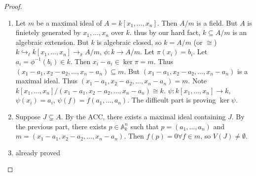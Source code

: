 \documentclass[12pt]{article}
\newcommand{\A}{\mathbb{A}}
\newcommand{\argmax}{\operatornamewithlimits{argmax}}
\begin{document}
   \begin{proof}
   \begin{enumerate}
   \item Let $m$ be a maximal ideal of $A=k[x_1,\dots,x_n]$.  Then $A/m$ is a field.  But $A$ is finietely generated by $x_1,\dots,x_n$ over $k$.  thus by our hard fact, $k\subseteq A/m$ is an algebraic extension.  But $k$ is algebraic closed, so $k=A/m$ (or $\cong$)
   $k\hookrightarrow_\ell k[x_1,\dots,x_n]\to_\pi A/m$, $\phi: k\to A/m$.
   Let $\pi(x_i)=b_i$.  Let $a_i=\phi^{-1}(b_i)\in k$.  Then $x_i-a_i\in \ker \pi = m$.  Thus $(x_1-a_1, x_2-a_2,\dots, x_n-a_n)\subseteq m$.  But $(x_1-a_1, x_2-a_2,\dots, x_n-a_n)$ is a maximal ideal.  Thus $(x_1-a_1, x_2-a_2,\dots, x_n-a_n)=m$.
   Note $k[x_1,\dots,x_n]/(x_1-a_1, x_2-a_2,\dots, x_n-a_n) \cong k$.  $\psi:k[x_1,\dots,x_n]\to k$, $\psi(x_i)=a_i$, $\psi(f)=f(a_1,\dots,a_n)$.  The difficult part is proving $\ker\psi$.
   \item Suppose $J\subsetneq A$. By the ACC, there exists a maximal ideal containing $J$.  By the previous part, there exists $p\in \A^n_k$ such that $p=(a_1,\dots,a_n)$ and $m=(x_1-a_1, x_2-a_2,\dots, x_n-a_n)$.  Then $f(p)=0 \forall f\in m$, so $V(J)\neq\emptyset$.
   \item already proved
   \end{enumerate}
   \end{proof}
   
   





\end{document}

